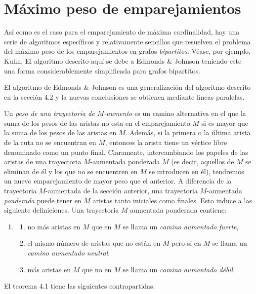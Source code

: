 \documentclass[10pt,a5paper]{book}
\begin{document}
\section{Máximo peso de emparejamientos}

Así como es el caso para el emparejamiento de máxima cardinalidad, hay una serie de algoritmos específicos y relativamente sencillos que resuelven el problema del máximo peso de los emparejamientos en grafos \emph{bipartitos}. Véase, por ejemplo, Kuhn\cite{p}. El algoritmo descrito aquí se debe a Edmonds \& Johnson\cite{q} teniendo este una forma considerablemente simplificada para grafos bipartitos.

El algoritmo de Edmonds \& Johnson es una generalización del algoritmo descrito en la sección 4.2 y la nuevas conclusiones se obtienen mediante líneas paralelas.

Un \emph{peso de una trayectoria de $M$-aumento} es un camino alternativa en el que la suma de los pesos de las aristas no esta en el emparejamiento $M$ si es mayor que la suma de los pesos de las aristas en $M$. Además, si la primera o la última arista de la ruta no se encuentran en $M$, entonces la arista tiene un vértice libre denominado como un punto final. Claramente, intercambiando los papeles de las aristas de una trayectoria $M$-aumentada ponderada $M$ (es decir, aquellos de $M$ se eliminan de él y los que no se encuentren en $M$ se introducen en él), tendremos un nuevo emparejamiento de mayor peso que el anterior. A diferencia de la trayectoria $M$-aumentada de la sección anterior, una trayectoria $M$-aumentada \emph{ponderada} puede tener en $M$ aristas tanto iniciales como finales. Esto induce a las siguiente definiciones. Una trayectoria $M$ aumentada ponderada contiene:
\begin{enumerate}
\item[]
\begin{enumerate}
\item no más aristas en $M$ que en $M$ se llama un \emph{camino aumentado fuerte},
\item el mismo número de aristas que no están en $M$ pero sí en $M$ se llama un \emph{camino aumentado neutral},
\item más aristas en $M$ que no en $M$ se llama un \emph{camino aumentado débil}.
\end{enumerate}
\end{enumerate}

El teorema 4.1 tiene las siguientes contrapartidas:
\end{document}
